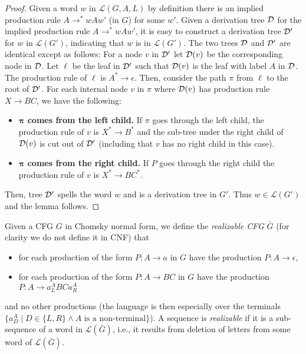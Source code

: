 \documentclass{CSML}
\newcommand{\lang}{\mathcal{L}}
\begin{document}
\begin{proof}
\smallskip\noindent{\bf $\mathbold{\lang(G,A,L)\subseteq \lang(G')}$.}
Given a word $w$ in $\lang(G,A,L)$ by definition there is an implied production rule $A\rightarrow^* wAw'$ (in $G$) for some $w'$. 
Given a derivation tree $\mathcal{D}$ for the implied production rule $A\rightarrow^* wAw'$, 
it is easy to construct a derivation tree $\mathcal{D}'$ for $w$ in $\lang(G')$, indicating that $w$ is in $\lang(G')$. 
The two trees $\mathcal{D}$ and $\mathcal{D}'$ are identical except as follows:
For a node $v$ in $\mathcal{D}'$ let $\mathcal{D}(v)$ be the corresponding node in $\mathcal{D}$. 
 Let $\ell$ be the leaf in $\mathcal{D}'$ such that $\mathcal{D}(v)$ is the leaf with label $A$ in $\mathcal{D}$. 
 The production rule of $\ell$ is $A^*\rightarrow \epsilon$. Then, consider the path $\pi$ from $\ell$ to the root of $\mathcal{D}'$. 
 For each internal node $v$ in $\pi$ where $\mathcal{D}(v)$ has production rule $X\rightarrow BC$, we have the following:
\begin{itemize}
\item  {\bf $\mathbold{\pi}$ comes from the left child.}  If $\pi$ goes through the left child, the production rule of $v$ is $X^*\rightarrow B^*$ and the sub-tree under the right child of $\mathcal{D}(v)$ is cut out of $\mathcal{D}'$ (including that $v$ has no right child in this case).
\item {\bf $\mathbold{\pi}$ comes from the right child.} If $P$ goes through the right child the production rule of $v$ is $X^*\rightarrow BC^*$.
\end{itemize} 
Then, tree $\mathcal{D}'$ spells the word $w$ and is a derivation tree in $G'$. Thus $w\in \lang(G')$ and the lemma follows.
\end{proof}



\smallskip{}
Given a CFG $G$ in Chomsky normal form, we define the {\em realizable CFG } $\bar{G}$ (for clarity we do not define it in CNF) that 
\begin{itemize}
\item for each production of the form $P:A\rightarrow a$ in $G$ have the production $P:A\rightarrow \epsilon$,
\item for each production of the form $P:A\rightarrow BC$ in $G$ have the production $P:A\rightarrow a_L^A B C a_R^A$
\end{itemize}
 and no other productions (the language is then especially over the terminals $\{a_D^A\mid D\in \{L,R\}\wedge A\textrm{ is a non-terminal}\}$). 
A sequence is {\em realizable} if it is a sub-sequence of a word in $\lang(\bar{G})$, i.e., it results from deletion of letters from some word of $\lang(\bar{G})$.
\end{document}
